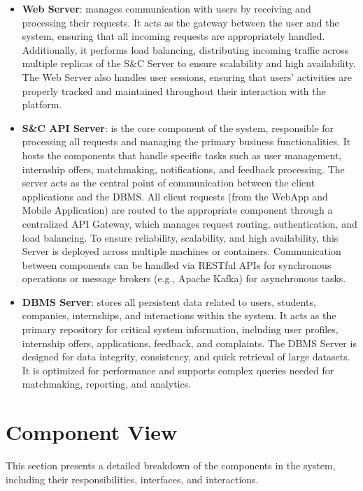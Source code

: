 \begin{itemize}
    \item \textbf{Web Server}: manages communication with users by receiving and processing their requests. It acts as the gateway between the user and the system, ensuring that all incoming requests are appropriately handled. Additionally, it performs load balancing, distributing incoming traffic across multiple replicas of the S\&C Server to ensure scalability and high availability. The Web Server also handles user sessions, ensuring that users' activities are properly tracked and maintained throughout their interaction with the platform.
    \item \textbf{S\&C API Server}:  is the core component of the system, responsible for processing all requests and managing the primary business functionalities. It hosts the components that handle specific tasks such as user management, internship offers, matchmaking, notifications, and feedback processing. The server acts as the central point of communication between the client applications and the DBMS. All client requests (from the WebApp and Mobile Application) are routed to the appropriate component through a centralized API Gateway, which manages request routing, authentication, and load balancing. To ensure reliability, scalability, and high availability, this Server is deployed across multiple machines or containers. Communication between components can be handled via RESTful APIs for synchronous operations or message brokers (e.g., Apache Kafka) for asynchronous tasks.
    \item \textbf{DBMS Server}: stores all persistent data related to users, students, companies, internships, and interactions within the system. It acts as the primary repository for critical system information, including user profiles, internship offers, applications, feedback, and complaints. The DBMS Server is designed for data integrity, consistency, and quick retrieval of large datasets. It is optimized for performance and supports complex queries needed for matchmaking, reporting, and analytics.
\end{itemize}

\section{Component View}
\label{sec:component_view}
This section presents a detailed breakdown of the components in the system, including their responsibilities, interfaces, and interactions.

